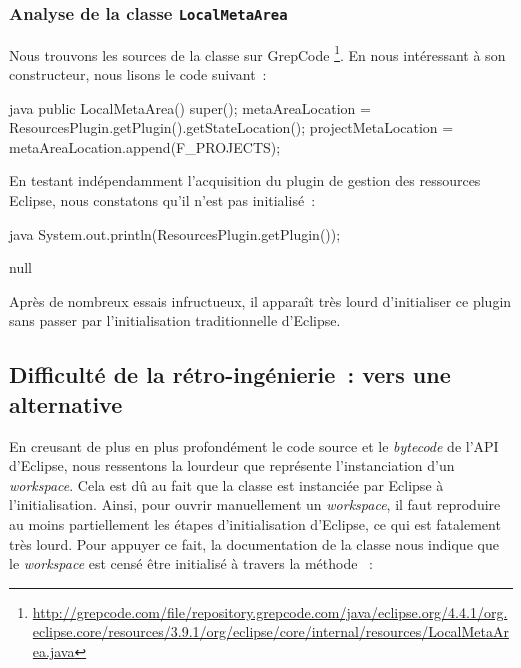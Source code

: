 \subsubsection{Analyse de la classe \texttt{LocalMetaArea}}

Nous trouvons les sources de la classe  sur GrepCode \footnote{%
\url{http://grepcode.com/file/repository.grepcode.com/java/eclipse.org/4.4.1/org.eclipse.core/resources/3.9.1/org/eclipse/core/internal/resources/LocalMetaArea.java}}.
En nous intéressant à son constructeur, nous lisons le code suivant~:

\begin{imtaCode}{java}
public LocalMetaArea() {
    super();
    metaAreaLocation = ResourcesPlugin.getPlugin().getStateLocation();
    projectMetaLocation = metaAreaLocation.append(F_PROJECTS);
}
\end{imtaCode}

En testant indépendamment l'acquisition du plugin de gestion des ressources Eclipse, nous constatons qu'il n'est pas initialisé~:

\begin{imtaCode}{java}
System.out.println(ResourcesPlugin.getPlugin());
\end{imtaCode}
\vspace{-0.5cm}
\begin{imtaConsole}
null
\end{imtaConsole}

Après de nombreux essais infructueux, il apparaît très lourd d'initialiser ce plugin sans passer par l'initialisation traditionnelle d'Eclipse.


\subsection{Difficulté de la rétro-ingénierie~: vers une alternative}

En creusant de plus en plus profondément le code source et le \textit{bytecode} de l'API d'Eclipse, nous ressentons la lourdeur que représente l'instanciation d'un \textit{workspace}.
Cela est dû au fait que la classe  est instanciée par Eclipse à l'initialisation.
Ainsi, pour ouvrir manuellement un \textit{workspace}, il faut reproduire au moins partiellement les étapes d'initialisation d'Eclipse, ce qui est fatalement très lourd.
Pour appuyer ce fait, la documentation de la classe  \cite{eclipseresourcesplugin} nous indique que le \textit{workspace} est censé être initialisé à travers la méthode %
~:\\

